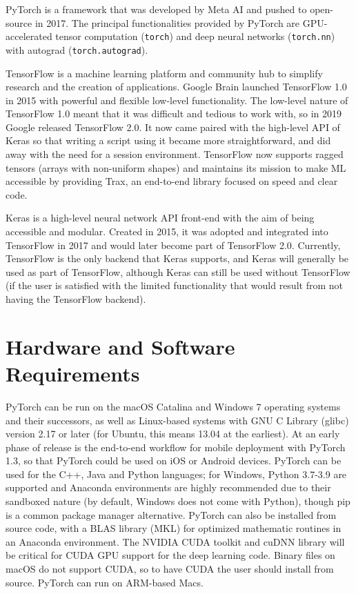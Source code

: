 \documentclass[conference]{IEEEtran}
\begin{document}
PyTorch is a framework that was developed by Meta AI and pushed to open-source in 2017. The principal functionalities provided by PyTorch are GPU-accelerated tensor computation (\verb+torch+) and deep neural networks (\verb+torch.nn+) with autograd (\verb+torch.autograd+).

TensorFlow is a machine learning platform and community hub to simplify research and the creation of applications. Google Brain launched TensorFlow 1.0 in 2015 with powerful and flexible low-level functionality. The low-level nature of TensorFlow 1.0 meant that it was difficult and tedious to work with, so in 2019 Google released TensorFlow 2.0. It now came paired with the high-level API of Keras so that writing a script using it became more straightforward, and did away with the need for a session environment. TensorFlow now supports ragged tensors (arrays with non-uniform shapes) and maintains its mission to make ML accessible by providing Trax, an end-to-end library focused on speed and clear code.

Keras is a high-level neural network API front-end with the aim of being accessible and modular. Created in 2015, it was adopted and integrated into TensorFlow in 2017 and would later become part of TensorFlow 2.0. Currently, TensorFlow is the only backend that Keras supports, and Keras will generally be used as part of TensorFlow, although Keras can still be used without TensorFlow (if the user is satisfied with the limited functionality that would result from not having the TensorFlow backend).

\section{Hardware and Software Requirements}

PyTorch can be run on the macOS Catalina and Windows 7 operating systems and their successors, as well as Linux-based systems with GNU C Library (glibc) version 2.17 or later (for Ubuntu, this means 13.04 at the earliest). At an early phase of release is the end-to-end workflow for mobile deployment with PyTorch 1.3, so that PyTorch could be used on iOS or Android devices. PyTorch can be used for the C++, Java and Python languages; for Windows, Python 3.7-3.9 are supported and Anaconda environments are highly recommended due to their sandboxed nature (by default, Windows does not come with Python), though pip is a common package manager alternative. PyTorch can also be installed from source code, with a BLAS library (MKL) for optimized mathematic routines in an Anaconda environment. The NVIDIA CUDA toolkit and cuDNN library will be critical for CUDA GPU support for the deep learning code. Binary files on macOS do not support CUDA, so to have CUDA the user should install from source. PyTorch can run on ARM-based Macs.
\end{document}
